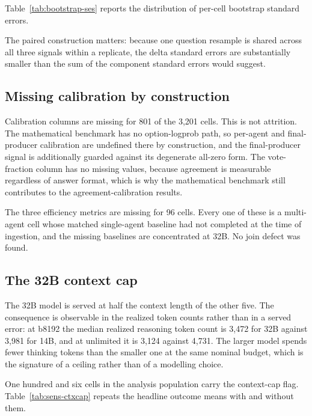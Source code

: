 Table~\ref{tab:bootstrap-ses} reports the distribution of per-cell bootstrap standard
errors.


The paired construction matters: because one question resample is shared across all three
signals within a replicate, the delta standard errors are substantially smaller than the
sum of the component standard errors would suggest.

\subsection{Missing calibration by construction}

Calibration columns are missing for 801 of the 3{,}201 cells. This is not attrition. The
mathematical benchmark has no option-logprob path, so per-agent and final-producer
calibration are undefined there by construction, and the final-producer signal is
additionally guarded against its degenerate all-zero form. The vote-fraction column has no
missing values, because agreement is measurable regardless of answer format, which is why
the mathematical benchmark still contributes to the agreement-calibration results.

The three efficiency metrics are missing for 96 cells. Every one of these is a multi-agent
cell whose matched single-agent baseline had not completed at the time of ingestion, and
the missing baselines are concentrated at 32B. No join defect was found.

\subsection{The 32B context cap}
\label{sec:health-cap}

The 32B model is served at half the context length of the other five. The consequence is
observable in the realized token counts rather than in a served error: at b8192 the median
realized reasoning token count is 3{,}472 for 32B against 3{,}981 for 14B, and at
unlimited it is 3{,}124 against 4{,}731. The larger model spends fewer thinking tokens than
the smaller one at the same nominal budget, which is the signature of a ceiling rather than
of a modelling choice.

One hundred and six cells in the analysis population carry the context-cap flag.
Table~\ref{tab:sens-ctxcap} repeats the headline outcome means with and without them.


